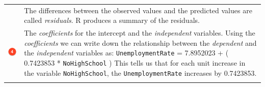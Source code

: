 \documentclass[]{article}
\theoremstyle{definition}
\theoremstyle{definition}
\theoremstyle{definition}
\theoremstyle{remark}
\begin{document}
\begin{longtable}[]{@{}ll@{}}
\begin{minipage}[t]{0.08\columnwidth}
\end{minipage} & \begin{minipage}[t]{0.86\columnwidth}\raggedright\strut
The differences between the observed values and the predicted values are
called \emph{residuals}. R produces a summary of the residuals.\strut
\end{minipage}\tabularnewline
\begin{minipage}[t]{0.08\columnwidth}\raggedright\strut
\includegraphics[width=1.00000\textwidth]{./img/circle4.png}\strut
\end{minipage} & \begin{minipage}[t]{0.86\columnwidth}\raggedright\strut
The \emph{coefficients} for the intercept and the \emph{independent}
variables. Using the \emph{coefficients} we can write down the
relationship between the \emph{dependent} and the \emph{independent}
variables as: \texttt{UnemploymentRate} = 7.8952023 + ( 0.7423853 *
\texttt{NoHighSchool} ) This tells us that for each unit increase in the
variable \texttt{NoHighSchool}, the \texttt{UnemploymentRate} increases
by 0.7423853.\strut
\end{minipage}\tabularnewline
\begin{minipage}[t]{0.08\columnwidth}\raggedright\strut

\end{minipage}
\end{longtable}
\end{document}
